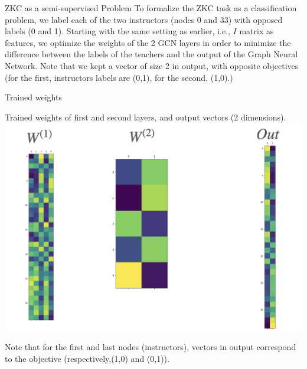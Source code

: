 \documentclass[a4paper,11pt]{book}
\begin{document}
\begin{textbox}{ZKC as a semi-supervised Problem}
To formalize the ZKC task as a classification problem, we label each of the two instructors (nodes 0 and 33) with opposed labels (0 and 1). Starting with the same setting as earlier, i.e., $I$ matrix as features, we optimize the weights of the 2 GCN layers in order to minimize the difference between the labels of the teachers and the output of the Graph Neural Network. Note that we kept a vector of size 2 in output, with opposite objectives (for the first, instructors labels are (0,1), for the second, (1,0).)
\end{textbox}


\begin{textbox}{Trained weights}
\centering

Trained weights of first and second layers, and output vectors (2 dimensions).
\includegraphics[width=0.8\linewidth]{pics/weights.png}

Note that for the first and last nodes (instructors), vectors in output correspond to the objective (respectively,(1,0) and (0,1)).
\end{textbox}
\end{document}
